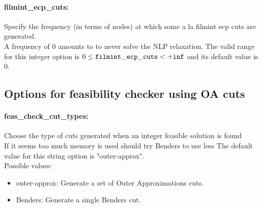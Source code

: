 \paragraph{filmint\_ecp\_cuts:}\label{sec:filmint_ecp_cuts} Specify the frequency (in terms of nodes) at which some a la filmint ecp cuts are generated. $\;$ \\
 A frequency of 0 amounts to to never solve the
NLP relaxation. The valid range for this integer option is
$0 \le {\tt filmint\_ecp\_cuts } <  {\tt +inf}$
and its default value is $0$.


\subsection{Options for feasibility checker using OA cuts}
\label{sec:Options_for_feasibility_checker_using_OA_cuts}
\paragraph{feas\_check\_cut\_types:}\label{sec:feas_check_cut_types} Choose the type of cuts generated when an integer feasible solution is found $\;$ \\
 If it seems too much memory is used should try
Benders to use less
The default value for this string option is "outer-approx".
\\ 
Possible values:
\begin{itemize}
   \item outer-approx: Generate a set of Outer Approximations cuts.
   \item Benders: Generate a single Benders cut.
\end{itemize}

